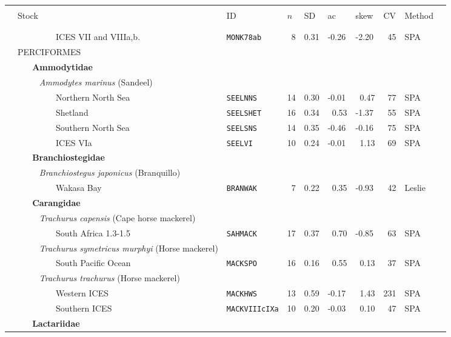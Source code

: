 \begin{flushleft}
\begin{tabular*}{7.1in}{llllllllll} 
\hline \\ 
&{\normalsize Stock}&{\normalsize ID}&{\normalsize $n$}&{\normalsize SD}&{\normalsize ac}&{\normalsize skew}&{\normalsize CV}&{\normalsize Method}  & \\ 
 &&&&&&&&&\\ 
  \hline  &&&&&&&&&\\ 
&~~~~~~~~~ICES VII and VIIIa,b.&{\tt MONK78ab}&~8&0.31&-0.26&-2.20&~45&SPA  & \\ 
&{\normalsize PERCIFORMES}&~&~&~&~&~&~&~  & \\ 
&{\bf~~~Ammodytidae}&~&~&~&~&~&~&~  & \\ 
&{\it~~~~~Ammodytes marinus} (Sandeel)&~&~&~&~&~&~&~  & \\ 
&~~~~~~~~~Northern North Sea&{\tt SEELNNS}&14&0.30&-0.01&~0.47&~77&SPA  & \\ 
&~~~~~~~~~Shetland&{\tt SEELSHET}&16&0.34&~0.53&-1.37&~55&SPA  & \\ 
&~~~~~~~~~Southern North Sea&{\tt SEELSNS}&14&0.35&-0.46&-0.16&~75&SPA  & \\ 
&~~~~~~~~~ICES VIa&{\tt SEELVI}&10&0.24&-0.01&~1.13&~69&SPA  & \\ 
&{\bf~~~Branchiostegidae}&~&~&~&~&~&~&~  & \\ 
&{\it~~~~~Branchiostegus japonicus} (Branquillo)&~&~&~&~&~&~&~  & \\ 
&~~~~~~~~~Wakasa Bay&{\tt BRANWAK}&~7&0.22&~0.35&-0.93&~42&Leslie  & \\ 
&{\bf~~~Carangidae}&~&~&~&~&~&~&~  & \\ 
&{\it~~~~~Trachurus capensis} (Cape horse mackerel)&~&~&~&~&~&~&~  & \\ 
&~~~~~~~~~South Africa 1.3-1.5&{\tt SAHMACK}&17&0.37&~0.70&-0.85&~63&SPA  & \\ 
&{\it~~~~~Trachurus symetricus murphyi} (Horse mackerel)&~&~&~&~&~&~&~  & \\ 
&~~~~~~~~~South Pacific Ocean&{\tt MACKSPO}&16&0.16&~0.55&~0.13&~37&SPA  & \\ 
&{\it~~~~~Trachurus trachurus} (Horse mackerel)&~&~&~&~&~&~&~  & \\ 
&~~~~~~~~~Western ICES&{\tt MACKHWS}&13&0.59&-0.17&~1.43&231&SPA  & \\ 
&~~~~~~~~~Southern ICES&{\tt MACKVIIIcIXa}&10&0.20&-0.03&~0.10&~47&SPA  & \\ 
&{\bf~~~Lactariidae}&~&~&~&~&~&~&~  & \\ 

\end{tabular*}
\end{flushleft}
